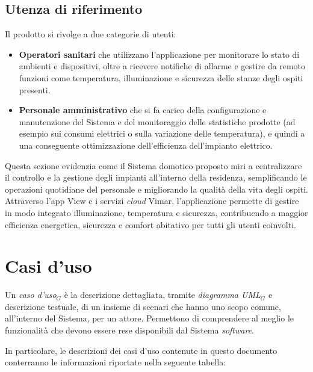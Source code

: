 \documentclass[10pt, letterpaper]{article}
\begin{document}
\subsection{Utenza di riferimento}{
    Il prodotto si rivolge a due categorie di utenti:
    \begin{itemize}
        \item \textbf{Operatori sanitari} che utilizzano l'applicazione per monitorare lo stato di ambienti e dispositivi, oltre a ricevere notifiche di allarme e gestire da remoto funzioni come temperatura, illuminazione e sicurezza delle stanze degli ospiti presenti.
        \item \textbf{Personale amministrativo} che si fa carico della configurazione e manutenzione del Sistema e del monitoraggio delle statistiche prodotte (ad esempio sui consumi elettrici o sulla variazione delle temperatura), e quindi a una conseguente ottimizzazione dell'efficienza dell'impianto elettrico.
    \end{itemize}
    Questa sezione evidenzia come il Sistema domotico proposto miri a centralizzare il controllo e la gestione degli impianti all’interno della residenza, semplificando le operazioni quotidiane del personale e migliorando la qualità della vita degli ospiti.
    Attraverso l’app View e i servizi \textit{cloud} Vimar, l’applicazione permette di gestire in modo integrato illuminazione, temperatura e sicurezza, contribuendo a maggior efficienza energetica, sicurezza e comfort abitativo per tutti gli utenti coinvolti.
}

\section{Casi d'uso}
Un \textit{caso d'uso$_{G}$} è la descrizione dettagliata, tramite \textit{diagramma UML$_G$} e descrizione testuale, di un insieme di scenari che hanno uno scopo comune, all'interno del Sistema, per un attore.
Permettono di comprendere al meglio le funzionalità che devono essere rese disponibili dal Sistema \textit{software}.

In particolare, le descrizioni dei casi d'uso contenute in questo documento conterranno le informazioni riportate nella seguente tabella:
\end{document}
